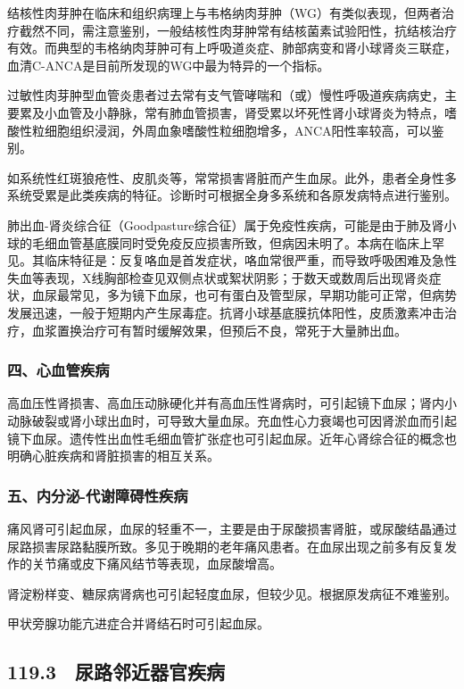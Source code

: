 结核性肉芽肿在临床和组织病理上与韦格纳肉芽肿（WG）有类似表现，但两者治疗截然不同，需注意鉴别，一般结核性肉芽肿常有结核菌素试验阳性，抗结核治疗有效。而典型的韦格纳肉芽肿可有上呼吸道炎症、肺部病变和肾小球肾炎三联症，血清C-ANCA是目前所发现的WG中最为特异的一个指标。

过敏性肉芽肿型血管炎患者过去常有支气管哮喘和（或）慢性呼吸道疾病病史，主要累及小血管及小静脉，常有肺血管损害，肾受累以坏死性肾小球肾炎为特点，嗜酸性粒细胞组织浸润，外周血象嗜酸性粒细胞增多，ANCA阳性率较高，可以鉴别。

如系统性红斑狼疮性、皮肌炎等，常常损害肾脏而产生血尿。此外，患者全身性多系统受累是此类疾病的特征。诊断时可根据全身多系统和各原发病特点进行鉴别。

肺出血-肾炎综合征（Goodpasture综合征）属于免疫性疾病，可能是由于肺及肾小球的毛细血管基底膜同时受免疫反应损害所致，但病因未明了。本病在临床上罕见。其临床特征是：反复咯血是首发症状，咯血常很严重，而导致呼吸困难及急性失血等表现，X线胸部检查见双侧点状或絮状阴影；于数天或数周后出现肾炎症状，血尿最常见，多为镜下血尿，也可有蛋白及管型尿，早期功能可正常，但病势发展迅速，一般于短期内产生尿毒症。抗肾小球基底膜抗体阳性，皮质激素冲击治疗，血浆置换治疗可有暂时缓解效果，但预后不良，常死于大量肺出血。

\subsubsection{四、心血管疾病}

高血压性肾损害、高血压动脉硬化并有高血压性肾病时，可引起镜下血尿；肾内小动脉破裂或肾小球出血时，可导致大量血尿。充血性心力衰竭也可因肾淤血而引起镜下血尿。遗传性出血性毛细血管扩张症也可引起血尿。近年心肾综合征的概念也明确心脏疾病和肾脏损害的相互关系。

\subsubsection{五、内分泌-代谢障碍性疾病}

痛风肾可引起血尿，血尿的轻重不一，主要是由于尿酸损害肾脏，或尿酸结晶通过尿路损害尿路黏膜所致。多见于晚期的老年痛风患者。在血尿出现之前多有反复发作的关节痛或皮下痛风结节等表现，血尿酸增高。

肾淀粉样变、糖尿病肾病也可引起轻度血尿，但较少见。根据原发病征不难鉴别。

甲状旁腺功能亢进症合并肾结石时可引起血尿。

\protect\hypertarget{text00279.html}{}{}

\subsection{119.3　尿路邻近器官疾病}

